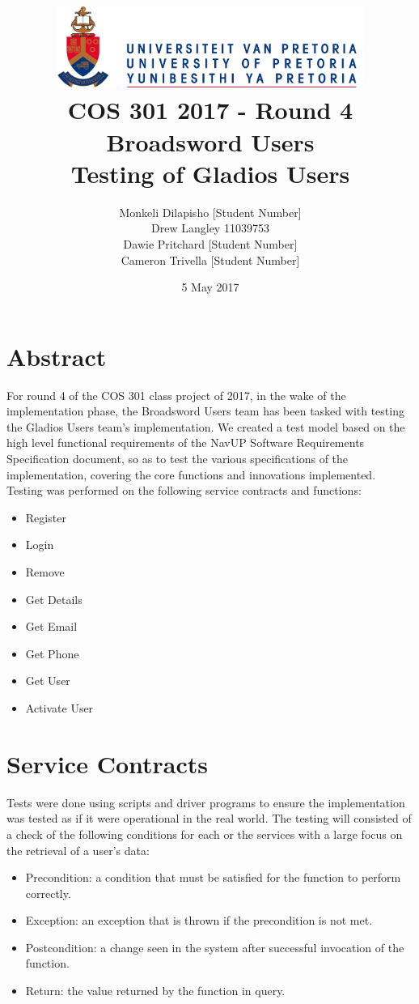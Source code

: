 \documentclass[12pt]{article}
\title{ \includegraphics[width=10cm]{up} \\ [0.5cm] COS 301 2017 - Round 4\\ Broadsword Users\\ Testing of Gladios Users }
\author{Monkeli Dilapisho \hfill [Student Number] \\ Drew Langley \hfill 11039753 \\ Dawie Pritchard \hfill [Student Number] \\ Cameron Trivella \hfill [Student Number]}
\date{5 May 2017}
\begin{document}
\maketitle
\pagebreak
\tableofcontents
\pagebreak


\section{Abstract}
	For round 4 of the COS 301 class project of 2017, in the wake of the implementation phase, the Broadsword Users team has been tasked with testing the Gladios Users team's 		implementation. We created a test model based on the high level functional requirements of the NavUP Software Requirements Specification document, so as to test the various 		specifications of the implementation, covering the core functions and innovations implemented.
	\\ 
	Testing was performed on the following service contracts and functions:
	\begin{itemize}
		\item Register
		\item Login
		\item Remove
		\item Get Details
		\item Get Email
		\item Get Phone 
		\item Get User
		\item Activate User
	\end{itemize}	

\pagebreak
	
\section{Service Contracts}
Tests were done using scripts and driver programs to ensure the implementation was tested as if it were operational in the real world.	
	\noindent The testing will consisted of a check of the following conditions for each or the services with a large focus on the retrieval of a user's data:\\
	 	
	 	\begin{itemize}
		\item Precondition: a condition that must be satisfied for the function to perform correctly.
		\item Exception: an exception that is thrown if the precondition is not met.
		\item Postcondition: a change seen in the system after successful invocation of the function.
		\item Return: the value returned by the function in query.
		\end{itemize}
			
\end{document}
